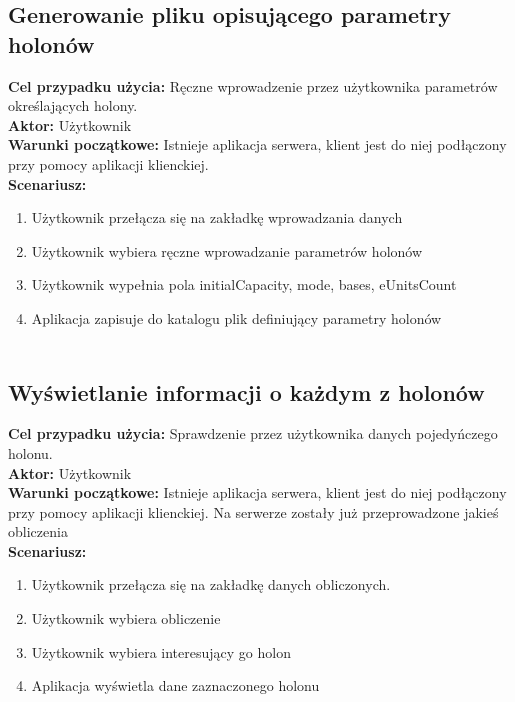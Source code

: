 \subsection{Generowanie pliku opisującego parametry holonów}
	\textbf{Cel przypadku użycia:} Ręczne wprowadzenie przez użytkownika parametrów określających holony.\\
	\textbf{Aktor:} Użytkownik\\
	\textbf{Warunki początkowe:} Istnieje aplikacja serwera, klient jest do niej podłączony przy pomocy aplikacji klienckiej.\\
	\textbf{Scenariusz:}
	\begin{enumerate}
	\item Użytkownik przełącza się na zakładkę wprowadzania danych
	\item Użytkownik wybiera ręczne wprowadzanie parametrów holonów
	\item Użytkownik wypełnia pola initialCapacity, mode, bases, eUnitsCount
	\item Aplikacja zapisuje do katalogu plik definiujący parametry holonów\\\\
	\end{enumerate}
	
\subsection{Wyświetlanie informacji o każdym z holonów}
	\textbf{Cel przypadku użycia:} Sprawdzenie przez użytkownika danych pojedyńczego holonu.\\
	\textbf{Aktor:} Użytkownik\\
	\textbf{Warunki początkowe:} Istnieje aplikacja serwera, klient jest do niej podłączony przy pomocy aplikacji klienckiej. Na serwerze zostały już przeprowadzone jakieś obliczenia\\
	\textbf{Scenariusz:}
	\begin{enumerate}
	\item Użytkownik przełącza się na zakładkę danych obliczonych.
	\item Użytkownik wybiera obliczenie
	\item Użytkownik wybiera interesujący go holon
	\item Aplikacja wyświetla dane zaznaczonego holonu\\\\
	\end{enumerate}
	

